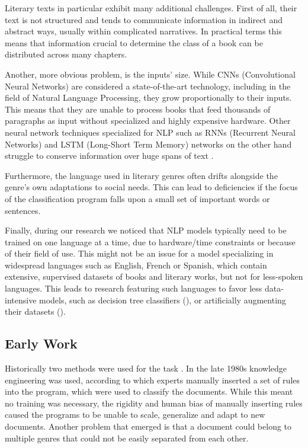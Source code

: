 \documentclass{article}
\begin{document}
	
	Literary texts in particular exhibit many additional challenges. First of all, their text is not structured and tends to communicate information in indirect and abstract ways, usually within complicated narratives. In practical terms this means that information crucial to determine the class of a book can be distributed across many chapters\cite{worsham}. \par 
	
	Another, more obvious problem, is the inputs' size. While CNNs (Convolutional Neural Networks) are considered a state-of-the-art technology, including in the field of Natural Language Processing, they grow proportionally to their inputs. This means that they are unable to process books that feed thousands of paragraphs as input without specialized and highly expensive hardware. Other neural network techniques specialized for NLP such as RNNs (Recurrent Neural Networks) and LSTM (Long-Short Term Memory) networks on the other hand struggle to conserve information over huge spans of text \cite{worsham_book}. \par
	
	Furthermore, the language used in literary genres often drifts alongside the genre's own adaptations to social needs. This can lead to deficiencies if the focus of the classification program falls upon a small set of important words or sentences\cite{brazil}. \par
	
	Finally, during our research we noticed that NLP models typically need to be trained on one language at a time, due to hardware/time constraints or because of their field of use. This might not be an issue for a model specializing in widespread languages such as English, French or Spanish, which contain extensive, supervised datasets of books and literary works, but not for less-spoken languages. This leads to research featuring such languages to favor less data-intensive models, such as decision tree classifiers (\cite{brazil}), or artificially augmenting their datasets (\cite{geroge}).\par
	
	\subsection{Early Work}
	
	Historically two methods were used for the task \cite{rami}. 
	In the late 1980s knowledge engineering was used, according to which experts manually inserted a set of rules into the program, which were used to classify the documents. While this meant no training was necessary, the rigidity and human bias of manually inserting rules caused the programs to be unable to scale, generalize and adapt to new documents. Another problem that emerged is that a document could belong to multiple genres that could not be easily separated from each other.\par
	
\end{document}
